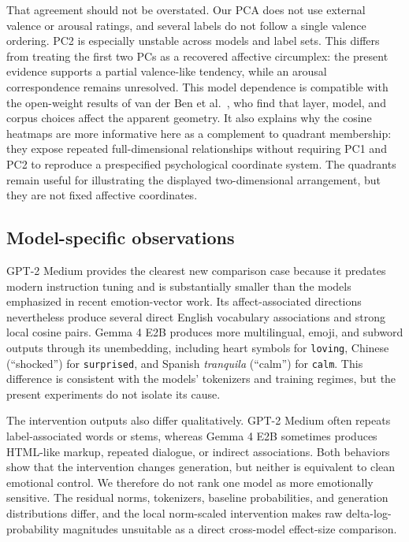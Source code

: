 That agreement should not be overstated. Our PCA does not use external valence or arousal ratings, and several labels do not follow a 
single valence ordering. PC2 is especially unstable across models and label sets. This differs from treating the first two PCs as a 
recovered affective circumplex: the present evidence supports a partial valence-like tendency, while an arousal correspondence 
remains unresolved. This model dependence is compatible with the open-weight results of van der Ben et al.\ \cite{ben_where_2026}, who 
find that layer, model, and corpus choices affect the apparent geometry. It also explains why the cosine heatmaps are more informative
here as a complement to quadrant membership: they expose repeated full-dimensional relationships without requiring PC1 and PC2 to 
reproduce a prespecified psychological coordinate system. The quadrants remain useful for illustrating the displayed two-dimensional 
arrangement, but they are not fixed affective coordinates.

\subsection{Model-specific observations}

GPT-2 Medium provides the clearest new comparison case because it predates modern instruction tuning and is substantially smaller than
the models emphasized in recent emotion-vector work. Its affect-associated directions nevertheless produce several direct English 
vocabulary associations and strong local cosine pairs. Gemma 4 E2B produces more multilingual, emoji, and subword outputs through 
its unembedding, including heart symbols for \texttt{loving}, Chinese  (``shocked'') for \texttt{surprised}, and Spanish 
\emph{tranquila} (``calm'') for \texttt{calm}. This difference is consistent 
with the models' tokenizers and training regimes, but the present experiments do not isolate its cause.

The intervention outputs also differ qualitatively. GPT-2 Medium often repeats label-associated words or stems, whereas Gemma 4 E2B 
sometimes produces HTML-like markup, repeated dialogue, or indirect associations. Both behaviors show that the intervention changes 
generation, but neither is equivalent to clean emotional control. We therefore do not rank one model as more emotionally sensitive. 
The residual norms, tokenizers, baseline probabilities, and generation distributions differ, and the local norm-scaled intervention 
makes raw delta-log-probability magnitudes unsuitable as a direct cross-model effect-size comparison.

